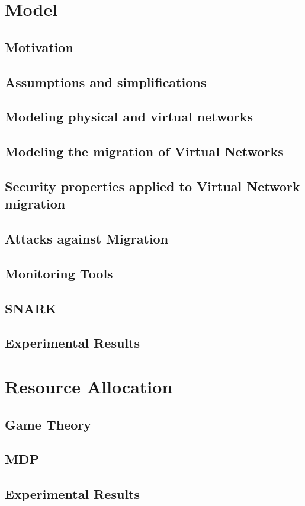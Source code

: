 \documentclass[a4paper, 11pt]{article}
\begin{document}
\newpage
\section{Model}
\subsection{Motivation}


\subsection{Assumptions and simplifications}


\subsection{Modeling physical and virtual networks}


\subsection{Modeling the migration of Virtual Networks}


\subsection{Security properties applied to Virtual Network migration}


\subsection{Attacks against Migration}



\subsection{Monitoring Tools}



\subsection{SNARK}

\subsection{Experimental Results}

\newpage
\section{Resource Allocation}
\subsection{Game Theory}
\subsection{MDP}

\subsection{Experimental Results}




{}

\end{document}
